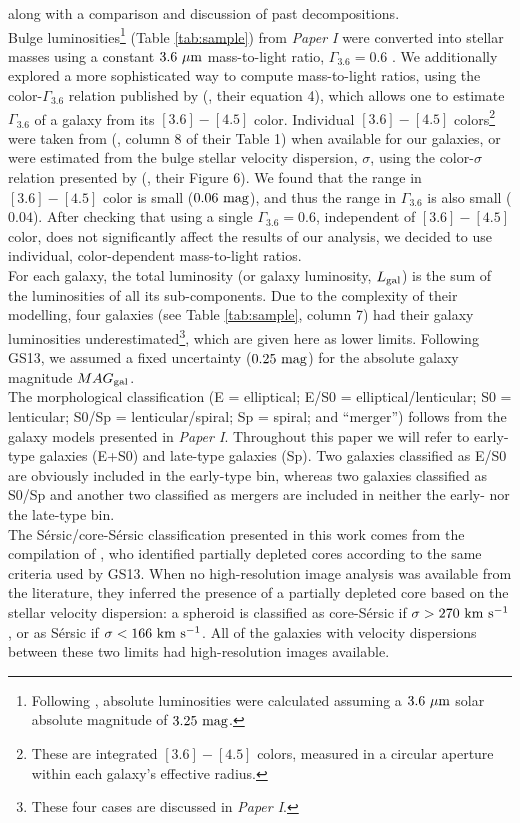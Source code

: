 \documentclass[preprint2]{emulateapj}
\begin{document}
along with a comparison and discussion of past decompositions. \\
Bulge luminosities\footnote{Following \cite{sani2011}, absolute luminosities were calculated 
assuming a $3.6\rm~\mu m$ solar absolute magnitude of $3.25\rm~mag$.} 
(Table \ref{tab:sample}) from \emph{Paper I} were converted into stellar masses 
using a constant $3.6\rm~\mu m$ mass-to-light ratio, $\Gamma_{3.6} = 0.6$ \citep{meidt2014}.
We additionally explored a more sophisticated way to compute mass-to-light ratios, 
using the color-$\Gamma_{3.6}$ relation published by 
\citeauthor{meidt2014} (\citeyear{meidt2014}, their equation 4), 
which allows one to estimate $\Gamma_{3.6}$ of a galaxy from its $[3.6] - [4.5]$ color. 
Individual $[3.6] - [4.5]$ colors\footnote{These are integrated $[3.6] - [4.5]$ colors, measured in a circular aperture 
within each galaxy's effective radius.} were taken from 
\citeauthor{peletier2012} (\citeyear{peletier2012}, column 8 of their Table 1) 
when available for our galaxies, 
or were estimated from the bulge stellar velocity dispersion, $\sigma$, 
using the color-$\sigma$ relation presented by \citeauthor{peletier2012} (\citeyear{peletier2012}, their Figure 6).
We found that the range in $[3.6] - [4.5]$ color is small ($0.06\rm~mag$), 
and thus the range in $\Gamma_{3.6}$ is also small ($0.04$).
After checking that using a single $\Gamma_{3.6} = 0.6$, independent of $[3.6] - [4.5]$ color, 
does not significantly affect the results of our analysis, 
we decided to use individual, color-dependent mass-to-light ratios. \\
For each galaxy, the total luminosity (or galaxy luminosity, $L_{\rm gal}$) is the sum of the luminosities of all its sub-components. 
Due to the complexity of their modelling, 
four galaxies (see Table \ref{tab:sample}, column 7) had their galaxy luminosities 
underestimated\footnote{These four cases are discussed in \emph{Paper I}.}, 
which are given here as lower limits. 
Following GS13, we assumed a fixed uncertainty ($0.25\rm~mag$) for the absolute galaxy magnitude $MAG_{\rm gal}$. \\
The morphological classification (E = elliptical; E/S0 = elliptical/lenticular; S0 = lenticular; S0/Sp = lenticular/spiral; Sp = spiral; and ``merger'') 
follows from the galaxy models presented in \emph{Paper I}. 
Throughout this paper we will refer to early-type galaxies (E+S0) and late-type galaxies (Sp). 
Two galaxies classified as E/S0 are obviously included in the early-type bin, 
whereas two galaxies classified as S0/Sp and another two classified as mergers are included in neither the early- nor the late-type bin.\\
The S\'ersic/core-S\'ersic classification presented in this work 
comes from the compilation of \citet{savorgnangraham2015},
who identified partially depleted cores according to the same criteria used by GS13.
When no high-resolution image analysis was available from the literature, 
they inferred the presence of a partially depleted core based on the stellar velocity dispersion:
a spheroid is classified as core-S\'ersic if $\sigma > 270\rm~km~s^{-1}$,
or as S\'ersic if $\sigma < 166\rm~km~s^{-1}$. 
All of the galaxies with velocity dispersions between these two limits had high-resolution images available. 
\end{document}
